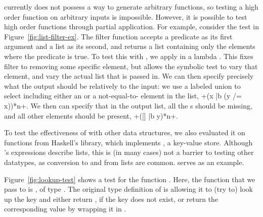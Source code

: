 \ourDSL currently does not possess a way to generate arbitrary functions, so testing a high order function on arbitrary inputs is impossible. 
However, it is possible to test high order functions through partial application. 
For example, consider the test in Figure~\ref{fig:list-filter-ex}.
The filter function accepts a predicate as its first argument and a list as its second, and returns a list containing only the elements where the predicate is true.
To test this with
\ourDSL,
we apply 
in a lambda .
This fixes filter to removing some specific element,
but allows the symbolic test to vary that element,
and vary the actual list that is passed in.
We can then specify precisely what the output
should be relatively to the input:
we use a labeled union to
select including either an 
or a not-equal-to- element in the list,
\hskin+(x |{b} (y /= x))*{n}+.
We then can specify
that in the output list, all the s
should be missing, and all other elements should be present,
\hskin+([] |{b} y)*{n}+.
 



 \label{subsec:case-studies-map}
To test the effectiveness of \ourDSL with other data structures, 
we also evaluated it on functions from Haskell's  
library, which implements ,
a key-value store.
Although \ourDSL's expressions describe lists,
this is (in many cases) not a barrier to testing other datatypes,
as conversion to and from lists are common.
 serves as an example.

Figure~\ref{fig:lookup-test} shows a test for the  function 
. Here, the function 
that we pass to  is ,
of type . The original 
type definition of  is 
allowing it to (try to) look up the key and
either return , if the key does not exist,
or return the corresponding value by wrapping it in .

